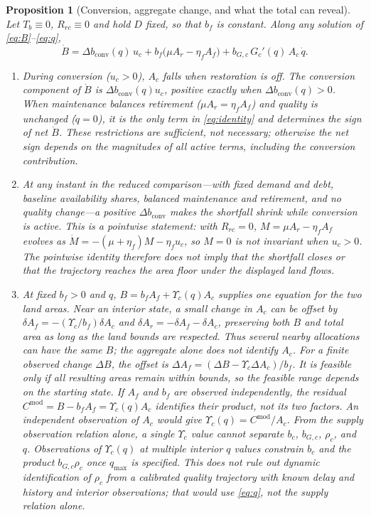 \documentclass[preprint,12pt,authoryear]{elsarticle}
\newtheorem{proposition}{Proposition}
\newcommand{\dconv}{\Delta b_{\mathrm{conv}}}
\newcommand{\Ups}{\Upsilon_c}
\begin{document}
\begin{proposition}[Conversion, aggregate change, and what the total can reveal]\label{prop:mask}
Let $T_b\equiv0$, $R_{rc}\equiv0$ and hold $D$ fixed, so that $b_f$ is constant. Along any solution of \eqref{eq:B}--\eqref{eq:q},
\begin{equation}\label{eq:identity}
\dot B=\dconv(q)\,u_c+b_f\big(\mu A_r-\eta_f A_f\big)+b_{G,c}\,G_c'(q)\,A_c\,\dot q .
\end{equation}
\begin{enumerate}[label=(\roman*)]
\item During conversion ($u_c>0$), $A_c$ falls when restoration is off. The conversion component of $\dot B$ is $\dconv(q)u_c$, positive exactly when $\dconv(q)>0$. When maintenance balances retirement ($\mu A_r=\eta_fA_f$) and quality is unchanged ($\dot q=0$), it is the only term in \eqref{eq:identity} and determines the sign of net $\dot B$. These restrictions are sufficient, not necessary; otherwise the net sign depends on the magnitudes of all active terms, including the conversion contribution.
\item At any instant in the reduced comparison—with fixed demand and debt, baseline availability shares, balanced maintenance and retirement, and no quality change—a positive $\dconv$ makes the shortfall shrink while conversion is active. This is a pointwise statement: with $R_{rc}=0$, $M=\mu A_r-\eta_fA_f$ evolves as $\dot M=-(\mu+\eta_f)M-\eta_fu_c$, so $M=0$ is not invariant when $u_c>0$. The pointwise identity therefore does not imply that the shortfall closes or that the trajectory reaches the area floor under the displayed land flows.
\item At fixed $b_f>0$ and $q$, $B=b_fA_f+\Ups(q)A_c$ supplies one equation for the two land areas. Near an interior state, a small change in $A_c$ can be offset by $\delta A_f=-(\Ups/b_f)\delta A_c$ and $\delta A_r=-\delta A_f-\delta A_c$, preserving both $B$ and total area as long as the land bounds are respected. Thus several nearby allocations can have the same $B$; the aggregate alone does not identify $A_c$. For a finite observed change $\Delta B$, the offset is $\Delta A_f=(\Delta B-\Ups\Delta A_c)/b_f$. It is feasible only if all resulting areas remain within bounds, so the feasible range depends on the starting state. If $A_f$ and $b_f$ are observed independently, the residual $C^{\mathrm{mod}}=B-b_fA_f=\Ups(q)A_c$ identifies their product, not its two factors. An independent observation of $A_c$ would give $\Ups(q)=C^{\mathrm{mod}}/A_c$. From the supply observation relation alone, a single $\Ups$ value cannot separate $b_c$, $b_{G,c}$, $\rho_c$, and $q$. Observations of $\Ups(q)$ at multiple interior $q$ values constrain $b_c$ and the product $b_{G,c}\rho_c$ once $q_{\max}$ is specified. This does not rule out dynamic identification of $\rho_c$ from a calibrated quality trajectory with known delay and history and interior observations; that would use \eqref{eq:q}, not the supply relation alone.
\end{enumerate}
\end{proposition}
\end{document}
